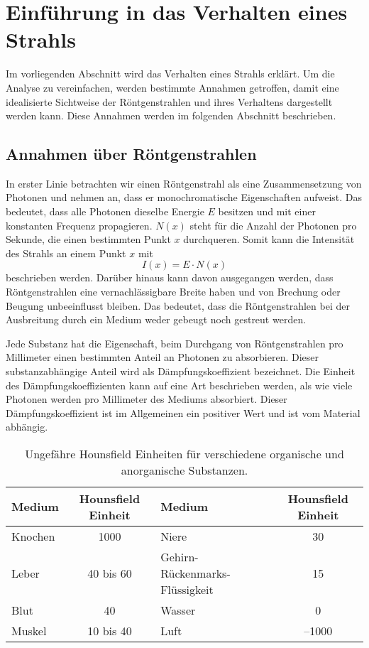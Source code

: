 %
%
%
%
\section{Einführung in das Verhalten eines Strahls
	\label{ct:section:EinführungEinesStrahls}}
Im vorliegenden Abschnitt wird das Verhalten eines Strahls erklärt. Um die Analyse zu vereinfachen, werden bestimmte Annahmen getroffen, damit eine idealisierte Sichtweise der Röntgenstrahlen und ihres Verhaltens dargestellt werden kann. Diese Annahmen werden im folgenden Abschnitt beschrieben.

\subsection{Annahmen über Röntgenstrahlen
	\label{ct:subsection:annahmen}}
In erster Linie betrachten wir einen Röntgenstrahl als eine Zusammensetzung von Photonen und nehmen an, dass er monochromatische Eigenschaften aufweist. Das bedeutet, dass alle Photonen dieselbe Energie $E$ besitzen und mit einer konstanten Frequenz propagieren. $N(x)$ steht für die Anzahl der Photonen pro Sekunde, die einen bestimmten Punkt $x$ durchqueren. Somit kann die Intensität des Strahls an einem Punkt $x$ mit
\begin{equation}
	I(x) = E\cdot N(x)
\end{equation}
beschrieben werden. Darüber hinaus kann davon ausgegangen werden, dass Röntgenstrahlen eine vernachlässigbare Breite haben und von Brechung oder Beugung unbeeinflusst bleiben. Das bedeutet, dass die Röntgenstrahlen bei der Ausbreitung durch ein Medium weder gebeugt noch gestreut werden.

Jede Substanz hat die Eigenschaft, beim Durchgang von Röntgenstrahlen pro Millimeter einen bestimmten Anteil an Photonen zu absorbieren. Dieser substanzabhängige Anteil wird als Dämpfungskoeffizient bezeichnet. Die Einheit des Dämpfungskoeffizienten kann auf eine Art beschrieben werden, als \glqq wie viele Photonen werden pro Millimeter des Mediums absorbiert\grqq. Dieser Dämpfungskoeffizient ist im Allgemeinen ein positiver Wert und ist vom Material abhängig.  
\begin{table}
	\centering
	\begin{tabular}{|>{}l<{}|>{}c<{}|| >{}l<{}| >{}c<{}|}
		\hline
		Medium &  Hounsfield Einheit & Medium &  Hounsfield Einheit\\
		\hline
		Knochen & 1000		& Niere & 30\\
		Leber 	& 40 bis 60	& Gehirn-Rückenmarks-Flüssigkeit & 15\\
		Blut 	& 40		& Wasser & 0\\
		Muskel 	& 10 bis 40 & Luft & --1000\\
		\hline
	\end{tabular}
	\caption{Ungefähre Hounsfield Einheiten für verschiedene organische und anorganische Substanzen.
		\label{ct:hounsfieldunits}}
\end{table}

